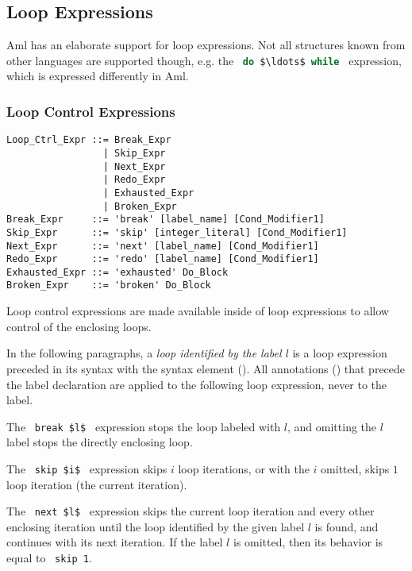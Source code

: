\subsection{Loop Expressions}

Aml has an elaborate support for loop expressions. Not all structures known from other languages are supported though, e.g. the ~\lstinline[language=Java]!do $\ldots$ while!~ expression, which is expressed differently in Aml. 






\subsubsection{Loop Control Expressions}
\label{sec:loop-control-expressions}

\syntax\begin{lstlisting}
Loop_Ctrl_Expr ::= Break_Expr
                 | Skip_Expr
                 | Next_Expr
                 | Redo_Expr
                 | Exhausted_Expr
                 | Broken_Expr
Break_Expr     ::= 'break' [label_name] [Cond_Modifier1]
Skip_Expr      ::= 'skip' [integer_literal] [Cond_Modifier1]
Next_Expr      ::= 'next' [label_name] [Cond_Modifier1]
Redo_Expr      ::= 'redo' [label_name] [Cond_Modifier1]
Exhausted_Expr ::= 'exhausted' Do_Block
Broken_Expr    ::= 'broken' Do_Block
\end{lstlisting}

Loop control expressions are made available inside of loop expressions to allow control of the enclosing loops.

In the following paragraphs, a {\em loop identified by the label $l$} is a loop expression preceded in its syntax with the syntax element  (). All annotations () that precede the label declaration are applied to the following loop expression, never to the label. 

The ~\lstinline!break $l$!~ expression stops the loop labeled with $l$, and omitting the $l$ label stops the directly enclosing loop. 

The ~\lstinline!skip $i$!~ expression skips $i$ loop iterations, or with the $i$ omitted, skips $1$ loop iteration (the current iteration). 

The ~\lstinline!next $l$!~ expression skips the current loop iteration and every other enclosing iteration until the loop identified by the given label $l$ is found, and continues with its next iteration. If the label $l$ is omitted, then its behavior is equal to ~\lstinline!skip 1!. 

